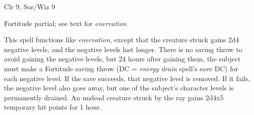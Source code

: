 
\begin{description*}
\item[Level:] Clr 9, Sor/Wiz 9
\item[Saving Throw:] Fortitude partial; see text for \textit{enervation}
\end{description*}

This spell functions like \textit{enervation}, except that the creature struck
gains 2d4 negative levels, and the negative levels last longer.
There is no saving throw to avoid gaining the negative levels, but 24 hours after
gaining them, the subject must make a Fortitude saving throw (DC = \textit{energy
drain} spell's save DC) for each negative level. If the save succeeds, that negative
level is removed. If it fails, the negative level also goes away, but one of the
subject's character levels is permanently drained.
An undead creature struck by the ray gains 2d4x5 temporary hit points for 1 hour.